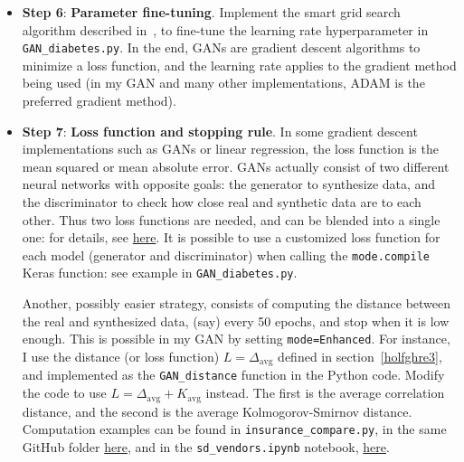 \documentclass[oneside,10pt]{book}
\begin{document}
\begin{itemize}
\item[] {\bf Step 6}: {\bf Parameter fine-tuning}. Implement the smart grid search algorithm described in~\cite{vgsmart}, to fine-tune the \textcolor{index}{learning rate} 
 hyperparameter in \texttt{GAN\_diabetes.py}. In the end, GANs are \textcolor{index}{gradient descent} algorithms to minimize a \textcolor{index}{loss function}, and the learning rate applies to the gradient method being used (in my GAN and many other implementations,
 ADAM is the preferred gradient method). \vspace{1ex}

\item[] {\bf Step 7}: {\bf Loss function and stopping rule}. In some gradient descent implementations such as GANs or linear regression, the loss function is the mean squared  or mean absolute error. GANs actually consist of two different neural networks with opposite goals: the generator to synthesize data, and the discriminator to check how close real and synthetic data are to each other. Thus two loss functions are needed, and can be blended into a single one: for details, see
 \href{https://neptune.ai/blog/gan-loss-functions}{here}. It is possible to use a customized loss function for each model (generator and discriminator) when calling the \texttt{mode.compile} \textcolor{index}{Keras} function: see example in \texttt{GAN\_diabetes.py}. 

Another, possibly easier strategy, consists of computing the distance between the real and synthesized data, (say) every 50 
\textcolor{index}{epochs}, and stop
 when it is low enough. This is possible in my GAN by setting \texttt{mode=\textquotesingle Enhanced\textquotesingle }. For instance, I use the distance (or loss function) 
$L = \Delta_{\text{avg}}$ 
defined in section~\ref{holfghre3}, and implemented as the \texttt{GAN\_distance} function in the Python code. Modify the code to use 
 $L = \Delta_{\text{avg}}+K_{\text{avg}}$ instead. The first is the average \textcolor{index}{correlation distance}, and the second is the average \textcolor{index}{Kolmogorov-Smirnov distance}. Computation examples can be found in \texttt{insurance\_compare.py}, 
in the same GitHub folder \href{https://github.com/VincentGranville/Main}{here},
 and in the \texttt{sd\_vendors.ipynb} notebook, \href{https://github.com/VincentGranville/Notebooks/blob/main/sd_vendors.ipynb}{here}. 
\vspace{1ex}


\end{itemize}
\end{document}
